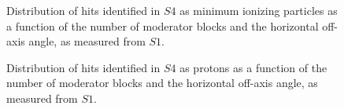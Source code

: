    	\begin{figure}[ht]
   		\begin{minipage}[t]{0.48\textwidth}
   			\begin{adjustbox}{max totalsize={\textwidth}{.35\textheight},center}
		   		
	   		\end{adjustbox}
	   		\caption{Distribution of hits identified in $S4$ as minimum ionizing particles as a function of the number of moderator blocks and the horizontal off-axis angle, as measured from $S1$.}
	   		\label{fig:thetas4mip}
   		\end{minipage}
   		\hspace{0.3cm}
   		\begin{minipage}[t]{0.48\textwidth}
	   		\begin{adjustbox}{max totalsize={\textwidth}{.35\textheight},center}
	   			
	   		\end{adjustbox}
   			\caption{Distribution of hits identified in $S4$ as protons as a function of the number of moderator blocks and the horizontal off-axis angle, as measured from $S1$.}
   			\label{fig:thetas4pro}
   		\end{minipage} 
   	
   	
	\end{figure}	
        
